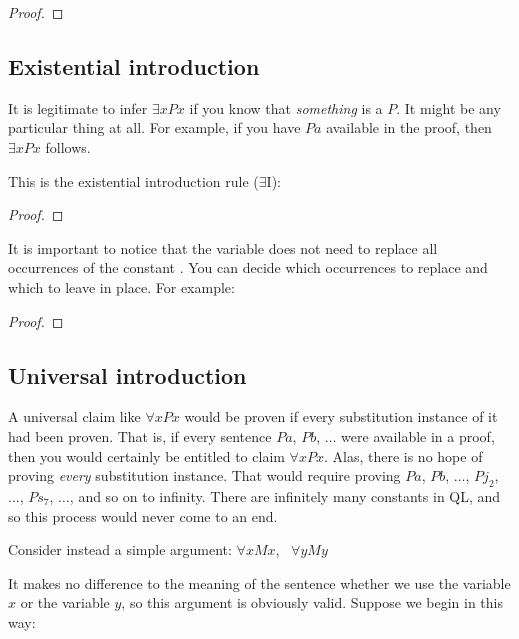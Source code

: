 \begin{proof}
	 
	 
\end{proof}


\subsection{Existential introduction}

It is legitimate to infer $\exists x Px$ if you know that \emph{something} is a $P$. It might be any particular thing at all. For example, if you have $Pa$ available in the proof, then $\exists x Px$ follows. 

This is the existential introduction rule ($\exists$I):

\begin{proof}
	 
\end{proof}

It is important to notice that the variable  does not need to replace all occurrences of the constant . You can decide which occurrences to replace and which to leave in place. For example:
\nopagebreak
\begin{proof}
	 
	 
	 
	 
	 
\end{proof}


\subsection{Universal introduction}
A universal claim like $\forall x Px$ would be proven if {every} substitution instance of it had been proven. That is, if every sentence $Pa$, $Pb$, $\ldots$ were available in a proof, then you would certainly be entitled to claim $\forall x Px$. Alas, there is no hope of proving \emph{every} substitution instance. That would require proving $Pa$, $Pb$, $\ldots$, $Pj_2$, $\ldots$, $Ps_7$, $\ldots$, and so on to infinity. There are infinitely many constants in QL, and so this process would never come to an end.

Consider instead a simple argument: $\forall x Mx$, \therefore\ $\forall y My$

It makes no difference to the meaning of the sentence whether we use the variable $x$ or the variable $y$, so this argument is obviously valid. Suppose we begin in this way:

